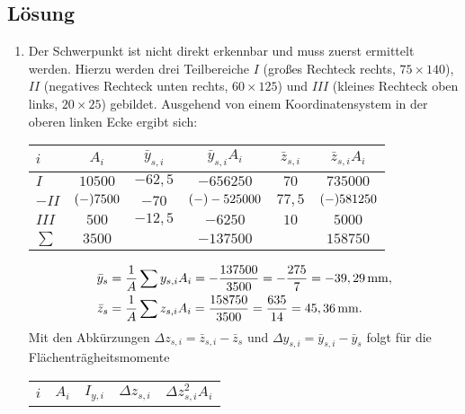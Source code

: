 \documentclass{exercise}
\begin{document}
    \subsection*{Lösung}
    \begin{enumerate}
        \item Der Schwerpunkt ist nicht direkt erkennbar und muss zuerst ermittelt werden.
        Hierzu werden drei Teilbereiche \(I\) (großes Rechteck rechts, \(75 \times 140\)), \(II\) (negatives Rechteck unten rechts, \(60 \times 125\)) und \(III\) (kleines Rechteck oben links, \(20 \times 25\)) gebildet.
        Ausgehend von einem Koordinatensystem in der oberen linken Ecke ergibt sich:
        \begin{center}
            \begin{tabular}{lccccc}
                \toprule
                \(i\) & \(A_i\) & \(\bar{y}_{s, i}\) & \(\bar{y}_{s, i}A_i\) & \(\bar{z}_{s, i}\) & \(\bar{z}_{s, i}A_i\)\\
                \midrule
                \(I\) & \(10500\) & \(-62,5\) & \(-656250\) & \(70\) & \(735000\)\\
                \(-II\) & \(\parentheses*{-}7500\) & \(-70\) & \(\parentheses*{-}-525000\) & \(77,5\) & \(\parentheses*{-}581250\)\\
                \(III\) & \(500\) & \(-12,5\) & \(-6250\) & \(10\) & \(5000\)\\
                \midrule
                \(\sum\) & \(3500\) & & \(-137500\) & & \(158750\)\\
                \bottomrule
            \end{tabular}
        \end{center}
        \begin{align*}
            \bar{y}_s &= \frac{1}{A}\sum y_{s, i}A_i = -\frac{137500}{3500} = -\frac{275}{7} = -39,29\sis{\milli\meter},\\
            \bar{z}_s &= \frac{1}{A}\sum z_{s, i}A_i = \frac{158750}{3500} = \frac{635}{14} = 45,36\sis{\milli\meter}.
        \end{align*}
        Mit den Abkürzungen \(\Delta z_{s, i} = \bar{z}_{s, i} - \bar{z}_s\) und \(\Delta y_{s, i} = \bar{y}_{s, i} - \bar{y}_s\) folgt für die Flächenträgheitsmomente
        \begin{center}
            \begin{tabular}{lcccc}
                \toprule
                \(i\) & \(A_i\) & \(I_{y, i}\) & \(\Delta z_{s, i}\) & \(\Delta z_{s, i}^2 A_i\)\\

\end{tabular}
\end{center}
\end{enumerate}
\end{document}
